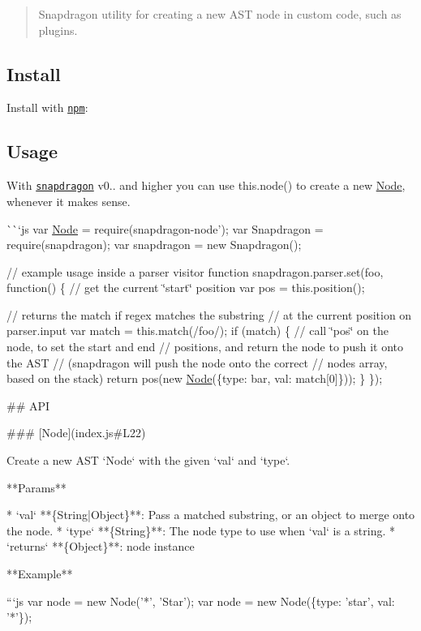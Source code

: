 \begin{quote}
Snapdragon utility for creating a new A\+ST node in custom code, such as plugins. \end{quote}


\subsection*{Install}

Install with \href{https://www.npmjs.com/}{\tt npm}\+:




\subsection*{Usage}

With \href{https://github.com/jonschlinkert/snapdragon}{\tt snapdragon} v0.. and higher you can use {\ttfamily this.\+node()} to create a new {\ttfamily \mbox{\hyperlink{classNode}{Node}}}, whenever it makes sense.

\`{}\`{}`js var \mbox{\hyperlink{classNode}{Node}} = require(\textquotesingle{}snapdragon-\/node'); var Snapdragon = require(\textquotesingle{}snapdragon\textquotesingle{}); var snapdragon = new Snapdragon();

// example usage inside a parser visitor function snapdragon.\+parser.\+set(\textquotesingle{}foo\textquotesingle{}, function() \{ // get the current \char`\"{}start\char`\"{} position var pos = this.\+position();

// returns the match if regex matches the substring // at the current position on {\ttfamily parser.\+input} var match = this.\+match(/foo/); if (match) \{ // call \char`\"{}pos\char`\"{} on the node, to set the start and end // positions, and return the node to push it onto the A\+ST // (snapdragon will push the node onto the correct // nodes array, based on the stack) return pos(new \mbox{\hyperlink{classNode}{Node}}(\{type\+: \textquotesingle{}bar\textquotesingle{}, val\+: match\mbox{[}0\mbox{]}\})); \} \}); 
\begin{DoxyCode}
## API

### [Node](index.js#L22)

Create a new AST `Node` with the given `val` and `type`.

**Params**

* `val` **\{String|Object\}**: Pass a matched substring, or an object to merge onto the node.
* `type` **\{String\}**: The node type to use when `val` is a string.
* `returns` **\{Object\}**: node instance

**Example**

```js
var node = new Node('*', 'Star');
var node = new Node(\{type: 'star', val: '*'\});
\end{DoxyCode}


